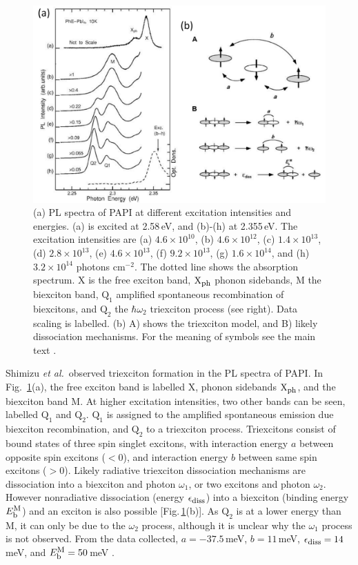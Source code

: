 \begin{figure}[h!]
\centering
\includegraphics[width=\textwidth]{Fig16}
\caption{(a) PL spectra of PAPI at different excitation intensities and energies. (a) is excited at 2.58\,eV, and (b)-(h) at 2.355\,eV. The excitation intensities are (a) $4.6\times 10^{10}$, (b) $4.6\times 10^{12}$, (c) $1.4\times 10^{13}$, (d) $2.8\times 10^{13}$, (e) $4.6\times 10^{13}$, (f) $9.2\times 10^{13}$, (g) $1.6\times 10^{14}$, and (h) $3.2\times 10^{14}$ photons c$\textrm{m}^{-2}$. The dotted line shows the absorption spectrum. X is the free exciton band, $\textrm{X}_{\textrm{\footnotesize ph}}$ phonon sidebands, M the biexciton band, $\textrm{Q}_1$ amplified spontaneous recombination of biexcitons, and $\textrm{Q}_2$ the $\hbar \omega_2$ triexciton process (see right). Data scaling is labelled. (b) A) shows the triexciton model, and B) likely dissociation mechanisms. For the meaning of symbols see the main text \cite{Shimizu2006a}.}
\label{2Fig16}
\end{figure}

Shimizu \textit{et al.}\ observed triexciton formation in the PL spectra of PAPI. In Fig.\ \ref{2Fig16}(a), the free exciton band is labelled X, phonon sidebands $\textrm{X}_{\textrm{\footnotesize ph}}$, and the biexciton band M. At higher excitation intensities, two other bands can be seen, labelled $\textrm{Q}_1$ and $\textrm{Q}_2$. $\textrm{Q}_1$ is assigned to the amplified spontaneous emission due biexciton recombination, and $\textrm{Q}_2$ to a triexciton process. Triexcitons consist of bound states of three spin singlet excitons, with interaction energy $a$ between opposite spin excitons ($<0$), and interaction energy $b$ between same spin excitons ($>0$). Likely radiative triexciton dissociation mechanisms are dissociation into a biexciton and photon $\omega_1$, or two excitons and photon $\omega_2$. However nonradiative dissociation (energy $\epsilon_{\textrm{\footnotesize diss}}$) into a biexciton (binding energy $E_{\textrm{\footnotesize b}}^{\textrm{\footnotesize M}}$) and an exciton is also possible [Fig.\,\ref{2Fig16}(b)]. As $\textrm{Q}_2$ is at a lower energy than M, it can only be due to the $\omega_2$ process, although it is unclear why the $\omega_1$ process is not observed. From the data collected, $a=-37.5$\,meV, $b=11$\,meV, $\epsilon_{\textrm{\footnotesize diss}}=14$\,meV, and $E_{\textrm{\footnotesize b}}^{\textrm{\footnotesize M}}=50$\,meV \cite{Shimizu2006a}. 

